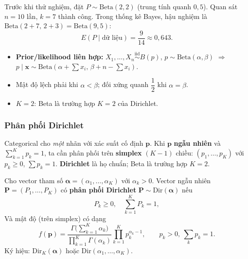 \documentclass[12pt,a4paper]{article}
\begin{document}
\begin{vidu}[title={Ước lượng tỷ lệ thành công}]
Trước khi thử nghiệm, đặt $P \sim \mathrm{Beta}(2,2)$ (trung tính quanh $0{,}5$). Quan sát $n=10$ lần, $k=7$ thành công. Trong thống kê Bayes, hậu nghiệm là $\mathrm{Beta}(2+7,\, 2+3) = \mathrm{Beta}(9,5)$:
\[
  E(P \mid \text{dữ liệu}) = \frac{9}{14} \approx 0{,}643.
\]
\end{vidu}

\begin{luuy}[title={Beta và Bernoulli/Nhị thức}]
  \begin{itemize}
    \item \textbf{Prior/likelihood liên hợp:} $X_1,\ldots,X_n \stackrel{\text{iid}}{\sim} B(p)$, $p \sim \mathrm{Beta}(\alpha,\beta)$ $\Rightarrow$ $p \mid \mathbf{x} \sim \mathrm{Beta}(\alpha + \sum x_i,\, \beta + n - \sum x_i)$.
    \item Mật độ lệch phải khi $\alpha < \beta$; đối xứng quanh $\dfrac{1}{2}$ khi $\alpha = \beta$.
    \item $K=2$: Beta là trường hợp $K=2$ của Dirichlet.
  \end{itemize}
\end{luuy}

\subsubsection{Phân phối Dirichlet}

\begin{dongco}[title={Động cơ - Vector tỷ lệ trên simplex}]
Categorical cho \emph{một} nhãn với xác suất cố định $\mathbf{p}$. Khi $\mathbf{p}$ \textbf{ngẫu nhiên} và $\sum_{k=1}^K p_k = 1$, ta cần phân phối trên \textbf{simplex} $(K-1)$ chiều: $(p_1,\ldots,p_K)$ với $p_k \ge 0$, $\sum p_k = 1$. \textbf{Dirichlet} là họ chuẩn; Beta là trường hợp $K=2$.
\end{dongco}

\begin{dinhnghia}[title={Phân phối Dirichlet}]
  Cho vector tham số $\boldsymbol{\alpha} = (\alpha_1, \ldots, \alpha_K)$ với $\alpha_k > 0$. Vector ngẫu nhiên $\mathbf{P} = (P_1, \ldots, P_K)$ có \textbf{phân phối Dirichlet} $\mathbf{P} \sim \mathrm{Dir}(\boldsymbol{\alpha})$ nếu
  \[
    P_k \ge 0,\quad \sum_{k=1}^{K} P_k = 1,
  \]
  Và mật độ (trên simplex) có dạng
  \[
    f(\mathbf{p}) = \frac{\Gamma\bigl(\sum_{k=1}^{K} \alpha_k\bigr)}{\prod_{k=1}^{K} \Gamma(\alpha_k)}
    \prod_{k=1}^{K} p_k^{\alpha_k - 1}, \qquad p_k > 0,\ \sum_k p_k = 1.
  \]
  Ký hiệu: $\mathrm{Dir}_K(\boldsymbol{\alpha})$ hoặc $\mathrm{Dir}(\alpha_1,\ldots,\alpha_K)$.
\end{dinhnghia}
\end{document}
